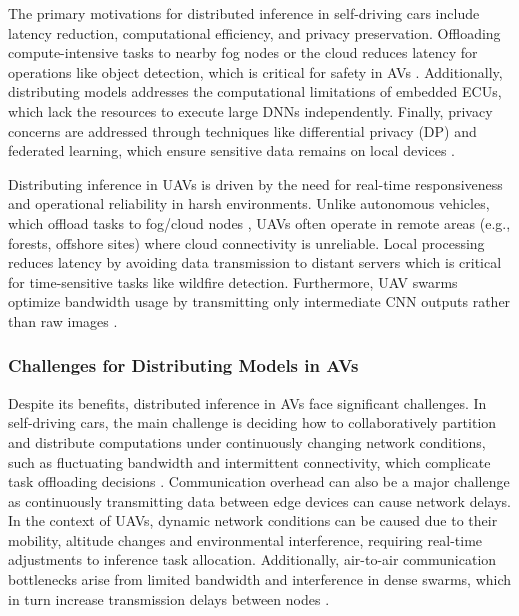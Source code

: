 \documentclass[conference]{IEEEtran}
\begin{document}
The primary motivations for distributed inference in self-driving cars include latency reduction, computational efficiency, and privacy preservation. Offloading compute-intensive tasks to nearby fog nodes or the cloud reduces latency for operations like object detection, which is critical for safety in AVs \cite{mohammed2020distributed}. Additionally, distributing models addresses the computational limitations of embedded ECUs, which lack the resources to execute large DNNs independently. Finally, privacy concerns are addressed through techniques like differential privacy (DP) and federated learning, which ensure sensitive data remains on local devices \cite{grigorescu2020cloud2edge}.

Distributing inference in UAVs is driven by the need for real-time responsiveness and operational reliability in harsh environments. Unlike autonomous vehicles, which offload tasks to fog/cloud nodes \cite{mohammed2020distributed}, UAVs often operate in remote areas (e.g., forests, offshore sites) where cloud connectivity is unreliable. Local processing reduces latency by avoiding data transmission to distant servers which is critical for time-sensitive tasks like wildfire detection. Furthermore, UAV swarms optimize bandwidth usage by transmitting only intermediate CNN outputs rather than raw images  \cite{jouhari2021distributed}. 


\subsubsection{Challenges for Distributing Models in AVs}

Despite its benefits, distributed inference in AVs face significant challenges. In self-driving cars, the main challenge is deciding how to collaboratively partition and distribute computations under continuously changing network conditions, such as fluctuating bandwidth and intermittent connectivity, which complicate task offloading decisions \cite{mohammed2020distributed}. Communication overhead can also be a major challenge as continuously transmitting data between edge devices can cause network delays. In the context of UAVs, dynamic network conditions can be caused due to their mobility, altitude changes and environmental interference, requiring real-time adjustments to inference task allocation. Additionally, air-to-air communication bottlenecks arise from limited bandwidth and interference in dense swarms, which in turn increase transmission delays between nodes \cite{jouhari2021distributed}.
\end{document}
